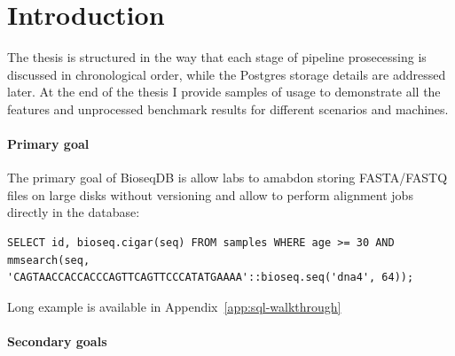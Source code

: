 \chapter*{Introduction}
    \raggedbottom

    The thesis is structured in the way that each stage of pipeline prosecessing is discussed in chronological order, while the Postgres storage details are addressed later.
    At the end of the thesis I provide samples of usage to demonstrate all the features and unprocessed benchmark results for different scenarios and machines.


  \begin{itemize}
    \setlength{\itemsep}{0pt}
    \setlength{\parsep}{0pt}
     {
    }
  \end{itemize}

\subsubsection{Primary goal}

The primary goal of BioseqDB is allow labs to amabdon storing FASTA/FASTQ files on large disks without versioning and allow to perform alignment jobs directly in the database:

\begin{lstlisting}[style=bioseq-search-sql,
  caption={Simplest BioseqDB SQL query},
  label={lst:first-sql-example-main}]
  SELECT id, bioseq.cigar(seq) FROM samples WHERE age >= 30 AND mmsearch(seq, 'CAGTAACCACCACCCAGTTCAGTTCCCATATGAAAA'::bioseq.seq('dna4', 64));
\end{lstlisting}
Long example is available in Appendix~\ref{app:sql-walkthrough}


\subsubsection{Secondary goals}

